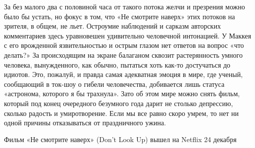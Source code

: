 За без малого два с половиной часа от такого потока желчи и презрения можно было бы устать, но фокус в том, что «Не смотрите наверх» этих потоков на зрителя, в общем, не льет. Остроумие наблюдений и сарказм авторских комментариев здесь уравновешен удивительно человечной интонацией. У Маккея с его врожденной язвительностью и острым глазом нет ответов на вопрос «что делать?» За происходящим на экране балаганом сквозит растерянность умного человека, вынужденного, как обычно, пытаться хоть как-то достучаться до идиотов. Это, пожалуй, и правда самая адекватная эмоция в мире, где ученый, сообщающий в ток-шоу о гибели человечества, добивается лишь статуса «астронома, которого я бы трахнула». Зато об этом мире можно снять фильм, который под конец очередного безумного года дарит не столько депрессию, сколько радость и умиротворение. Если мы все равно скоро умрем, то нет ни одной причины отказываться от праздничного ужина.

Фильм «Не смотрите наверх» (Don't Look Up) вышел на Netflix 24 декабря

